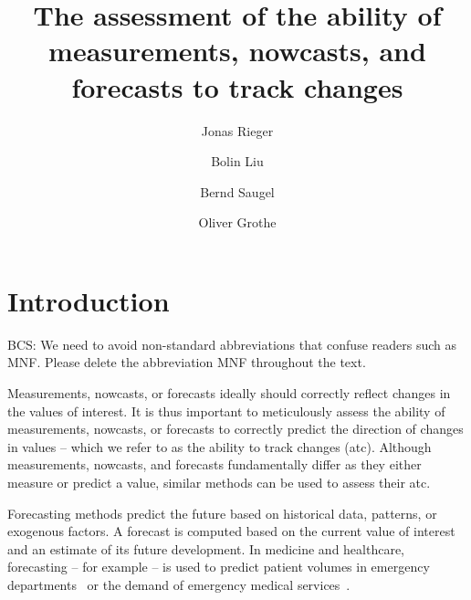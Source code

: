 \documentclass[pdflatex]{sn-jnl}
\theoremstyle{plain}%
\theoremstyle{definition}
\begin{document}
\title{The assessment of the ability of measurements, nowcasts, and forecasts to track changes}
\author*[1]{Jonas Rieger}
\author[1]{Bolin Liu}
\author[2]{Bernd Saugel}
\author[1]{Oliver Grothe}

\keywords{}

\maketitle



\section{Introduction}\label{sec:atc-introduction}
BCS: We need to avoid non-standard abbreviations that confuse readers such as MNF. Please delete the abbreviation MNF throughout the text.

Measurements, nowcasts, or forecasts ideally should correctly reflect changes in the values of interest. It is thus important to meticulously assess the ability of measurements, nowcasts, or forecasts to correctly predict the direction of changes in values – which we refer to as the ability to track changes (\ac{atc}). Although measurements, nowcasts, and forecasts fundamentally differ as they either measure or predict a value, similar methods can be used to assess their \ac{atc}.

Forecasting methods predict the future based on historical data, patterns, or exogenous factors. A forecast is computed based on the current value of interest and an estimate of its future development.
In medicine and healthcare, forecasting – for example – is used to predict patient volumes in emergency departments~\parencite{Jones2008, Rostami-Tabar2023} or the demand of emergency medical services~\parencite{HaugsboHermansen2021}.
\end{document}
